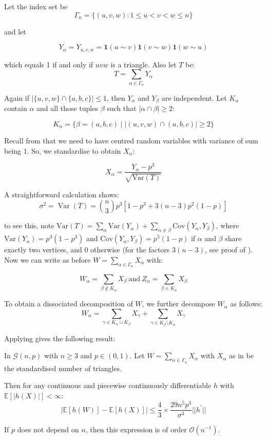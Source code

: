 \documentclass{article}
\begin{document}
Let the index set be 
\[
\Gamma_n = \{(u,v,w): 1\leq u<v<w\leq n\}
\]

and let 

\[
Y_\alpha = Y_{u,v,w} = \mathbf{1}(u\sim v) \mathbf{1}(v\sim w) \mathbf{1}(w\sim u)
\]

which equals 1 if and only if $uvw$ is a triangle. Also let $T$ be:
\[
T = \sum_{\alpha \in \Gamma_n} Y_\alpha
\]

Again if $|\{u,v,w\}\cap \{a,b,c\}|\leq 1$, then $Y_\alpha$ and $Y_\beta$ are independent. Let $K_\alpha$ contain $\alpha$ and all those tuples $\beta$ such that $|\alpha\cap \beta|\geq 2$:

\begin{equation*}
    K_{\alpha} = \{\beta = (a,b,c) \mid |(u,v,w)\cap (a,b,c)|\geq 2\}
\end{equation*}

Recall from  that we need to have centred random variables with variance of sum being $1$. So, we standardise to obtain $X_\alpha$:

\begin{equation}\label{eq:standardise_triangle}    
    X_{\alpha}=\frac{Y_{\alpha}-p^{3}}{\sqrt{\mathrm{Var}(T)}}
\end{equation}


A straightforward calculation shows:
\[
    \sigma^{2}=\operatorname{Var}(T)={\binom{n}{3}}p^{3}[1-p^{3}+3(n-3)p^{2}(1-p)]
\]

to see this, note $\mathrm{Var}(T) = \sum_\alpha \mathrm{Var}(Y_\alpha) + \sum_{\alpha\neq \beta} \mathrm{Cov}(Y_\alpha, Y_\beta)$, where $\mathrm{Var}(Y_\alpha) = p^3(1-p^3)$ and $\mathrm{Cov}(Y_\alpha, Y_\beta) = p^5(1-p)$ if $\alpha$ and $\beta$ share exactly two vertices, and 0 otherwise (for the factors $3(n-3)$, see proof of ). Now we can write as before $W = \sum_{\alpha \in \Gamma_n} X_\alpha$ with:

\[
    W_{\alpha}=\sum_{\beta\notin K_{\alpha}}X_{\beta}{\mathrm{~and~}}Z_{\alpha}=\sum_{\beta\in K_{\alpha}}X_{\beta}
\]

To obtain a dissociated decomposition of $W$, we further decompose $W_\alpha$ as follows:
\[
    W_{\alpha}=\sum_{\gamma\in K_{\alpha}\cup K_{\beta}}X_{\gamma}+\sum_{\gamma\in K_{\beta}\setminus K_{\alpha}}X_{\gamma}
\]

Applying  gives the following result:

\begin{theorem}\label{thm:triangle_gnp_normal}
    In $\mathcal{G}(n,p)$ with $n\geq 3$ and $p\in (0,1)$. Let $W = \sum_{\alpha \in \Gamma_n} X_\alpha$  with $X_\alpha$ as in  be the standardised number of triangles.  
    
    Then for any continuous and piecewise continuously differentiable $h$ with $\mathbb{E}[|h(X)|]<\infty$: 
    \[
        |\mathbb{E} [h(W)]- \mathbb{E}[h(X)]| \leq \frac{4}{3}\times\frac{29n^{5}p^{3}}{\sigma^{3}}||h^{\prime}||
    \]

    If $p$ does not depend on $n$, then this expression is of order $\mathcal{O}(n^{-1})$.
\end{theorem}
\end{document}
